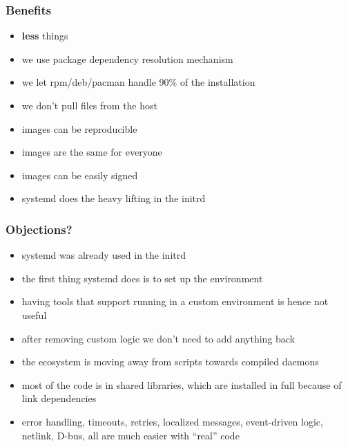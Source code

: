 \documentclass[]{beamer}
\newcommand\pp\pause
\begin{document}
\begin{frame}
  \frametitle{Benefits}

  \begin{itemize}
  \item \textbf{less} things
    \pp
  \item we use package dependency resolution mechanism
    \pp
  \item we let rpm/deb/pacman handle 90\% of the installation
    \pp
  \item we don't pull files from the host
    \pp
  \item images can be reproducible
    \pp
  \item images are the same for everyone
    \pp
  \item images can be easily signed
    \pp
  \item systemd does the heavy lifting in the initrd
  \end{itemize}
\end{frame}

\begin{frame}
  \frametitle{Objections?}


  \begin{itemize}
    \pp
    \item 
      systemd was already used in the initrd
    \pp
    \item 
      the first thing systemd does is to set up the environment
    \pp
    \item 
      having tools that support running in a custom environment is hence not useful
    \pp
    \item 
      after removing custom logic we don't need to add anything back
    \pp
    \item 
      the ecosystem is moving away from scripts towards compiled daemons
    \pp
    \item 
      most of the code is in shared libraries, which are installed in full because of link dependencies
    \pp
    \item 
      error handling, timeouts, retries, localized messages, event-driven logic, netlink,
      D-bus, all are much easier with ``real'' code
  \end{itemize}
\end{frame}
\end{document}
